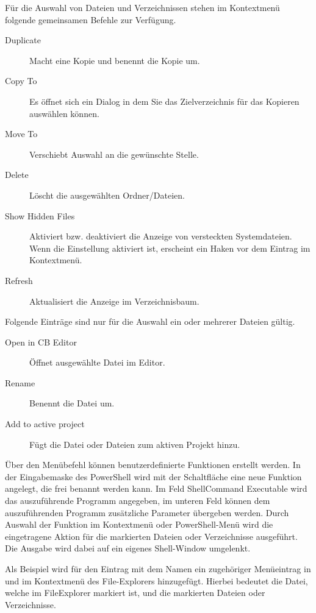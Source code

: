Für die Auswahl von Dateien und Verzeichnissen stehen im Kontextmenü folgende gemeinsamen Befehle zur Verfügung.

\begin{description}
\item[Duplicate] Macht eine Kopie und benennt die Kopie um.
\item[Copy To] Es öffnet sich ein Dialog in dem Sie das Zielverzeichnis für das Kopieren auswählen können.
\item[Move To] Verschiebt Auswahl an die gewünschte Stelle.
\item[Delete] Löscht die ausgewählten Ordner/Dateien.
\item[Show Hidden Files] Aktiviert bzw. deaktiviert die Anzeige von versteckten Systemdateien. Wenn die Einstellung aktiviert ist, erscheint ein Haken vor dem Eintrag im Kontextmenü.
\item[Refresh] Aktualisiert die Anzeige im Verzeichnisbaum.
\end{description}

Folgende Einträge sind nur für die Auswahl ein oder mehrerer Dateien gültig.

\begin{description}
\item[Open in CB Editor] Öffnet ausgewählte Datei im \codeblocks Editor.
\item[Rename] Benennt die Datei um.
\item[Add to active project] Fügt die Datei oder Dateien zum aktiven Projekt hinzu.
\end{description}


Über den Menübefehl  können benutzerdefinierte Funktionen erstellt werden. In der Eingabemaske des PowerShell wird mit der Schaltfläche  eine neue Funktion angelegt, die frei benannt werden kann. Im Feld ShellCommand Executable wird das auszuführende Programm angegeben, im unteren Feld können dem auszuführenden Programm zusätzliche Parameter übergeben werden.
Durch Auswahl der Funktion im Kontextmenü oder PowerShell-Menü wird die eingetragene Aktion für die markierten Dateien oder Verzeichnisse ausgeführt. Die Ausgabe wird dabei auf ein eigenes Shell-Window umgelenkt.

Als Beispiel wird für den Eintrag mit dem Namen  ein zugehöriger Menüeintrag in  und im Kontextmenü des File-Explorers hinzugefügt. Hierbei bedeutet  die Datei, welche im FileExplorer markiert ist, und  die markierten Dateien oder Verzeichnisse.

